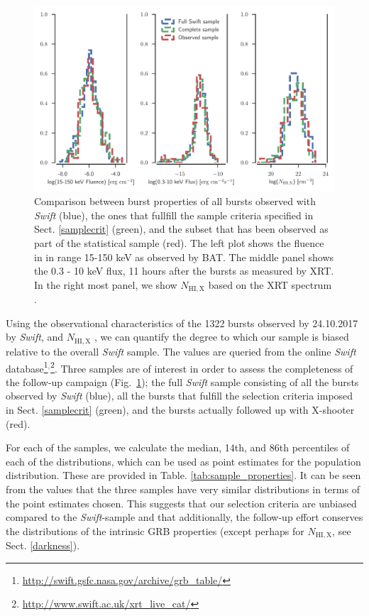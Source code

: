 \documentclass{aa}    %
\begin{document}
\begin{figure}
	\centerline{\includegraphics[width=18cm]{figures/completeness_BAT.pdf}}
\caption{Comparison between burst properties of all bursts observed with
	\textit{Swift} (blue), the ones that fullfill the sample criteria specified in
	Sect. \ref{samplecrit} (green), and the subset that has been observed as part of
	the statistical sample (red). The left plot shows the fluence in in range 15-150
	keV as observed by BAT. The middle panel shows the 0.3 - 10 keV flux, 11 hours
	after the bursts as measured by XRT. In the right most panel, we show
	$N_{\mathrm{HI,X}}$ based on the XRT spectrum \citep{Evans2009}.}
\label{fig:swift_complete}
\end{figure}

Using the observational characteristics of the 1322 bursts observed by
24.10.2017 by \textit{Swift}, and $N_{\mathrm{HI,X}}$ \citep{Evans2009}, we can
quantify the degree to which our sample is biased relative to the overall
\textit{Swift} sample. The values are queried from the online \textit{Swift}
database\footnote{\url{http://swift.gsfc.nasa.gov/archive/grb\_table/}}$^,$\footnote{\url{http://www.swift.ac.uk/xrt\_live\_cat/}}. Three samples are of interest in order to assess the completeness of the follow-up campaign (Fig.~\ref{fig:swift_complete}); the full \textit{Swift} sample consisting of all the bursts observed by \textit{Swift} (blue), all the bursts that fulfill the selection criteria imposed in Sect. \ref{samplecrit} (green), and the bursts actually followed up with X-shooter (red).



For each of the samples, we calculate the median, 14th, and 86th percentiles of
each of the distributions, which can be used as point estimates for the
population distribution. These are provided in Table.
\ref{tab:sample_properties}. It can be seen from the values that the three
samples have very similar distributions in terms of the point estimates chosen.
This suggests that our selection criteria are unbiased compared to the
\textit{Swift}-sample and that additionally, the follow-up effort conserves the
distributions of the intrinsic GRB properties (except perhaps for $N_{\mathrm{HI,X}}$, see Sect. \ref{darkness}). 
\end{document}
